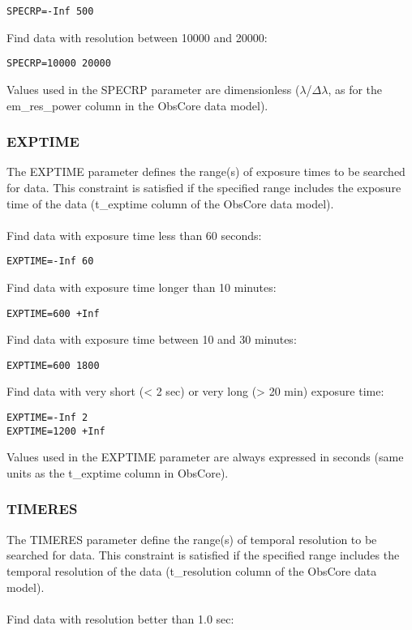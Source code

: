 \documentclass[11pt,a4paper]{ivoa}
\begin{document}
\begin{lstlisting}
SPECRP=-Inf 500
\end{lstlisting}
Find data with resolution between 10000 and 20000:

\begin{lstlisting}
SPECRP=10000 20000
\end{lstlisting}


Values used in the SPECRP parameter are dimensionless ($\lambda$/$\Delta$$\lambda$, as for the em\_res\_power column in the ObsCore data model).

\subsubsection{EXPTIME}

The EXPTIME parameter defines the range(s) of exposure times to be searched for data. This constraint is satisfied if the specified range includes the exposure time of the data (t\_exptime column of the ObsCore  data model). \\ \\
Find data with exposure time less than  60 seconds:

\begin{lstlisting}
EXPTIME=-Inf 60
\end{lstlisting}
Find data with exposure time longer than 10 minutes:

\begin{lstlisting}
EXPTIME=600 +Inf
\end{lstlisting}
Find data with exposure time between 10 and 30 minutes:

\begin{lstlisting}
EXPTIME=600 1800
\end{lstlisting}
Find data with very short (< 2 sec) or very long (> 20 min) exposure time:

\begin{lstlisting}
EXPTIME=-Inf 2
EXPTIME=1200 +Inf
\end{lstlisting}


Values used in the EXPTIME parameter are always expressed in seconds (same units as the t\_exptime column in ObsCore).

\subsubsection{TIMERES}
The TIMERES parameter define the range(s) of temporal resolution to be searched for data. This constraint is satisfied if the specified range includes the temporal resolution of the data (t\_resolution column of the ObsCore data model). \\ \\
Find data with resolution better than 1.0 sec:
\end{document}
